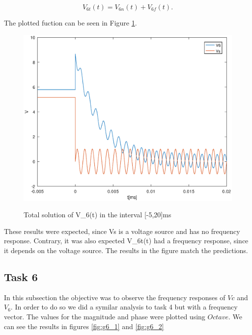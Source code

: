 \begin{equation}
 V_{6t}(t) = V_{6n}(t) + V_{6f}(t).
\end{equation}

\par The plotted fuction can be seen in Figure \ref{fig:g5}.

\begin{figure}[h] \centering
 \caption{Total solution of V_{6}(t) in the interval [-5,20]ms}
 \includegraphics[width=0.8\linewidth]{tsol.eps}
 \label{fig:g5}
\end{figure}

\par These results were expected, since Vs is a voltage source and has no frequency response. Contrary, it was also expected V_{6t}(t) had a frequency response, since it depends on the voltage source. The results in the figure match the predictions.

\subsection{Task 6}
\par In this subsection the objective was to observe the frequency responses of $Vc$ and $V_{6}$. In order to do so we did a symilar analysis to task 4 but with a frequency vector. The values for the magnitude and phase were plotted using $Octave$. We can see the results in figures \ref{fig:g6_1} and \ref{fig:g6_2}

